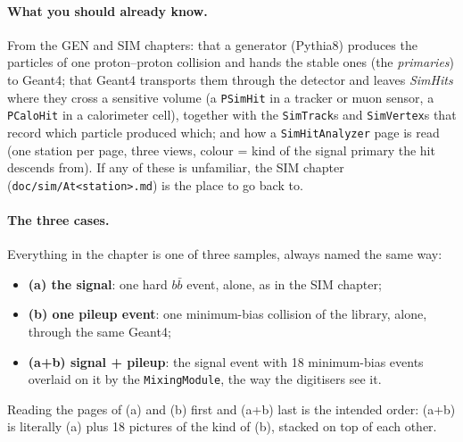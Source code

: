 \documentclass[11pt,a4paper]{article}
\newcommand{\code}[1]{\texttt{#1}}
\newcommand{\bbbar}{\ensuremath{b\bar{b}}}
\begin{document}
\paragraph{What you should already know.} From the GEN and SIM chapters: that a generator (Pythia8) produces
the particles of one proton--proton collision and hands the stable ones (the \emph{primaries}) to Geant4;
that Geant4 transports them through the detector and leaves \emph{SimHits} where they cross a sensitive
volume (a \code{PSimHit} in a tracker or muon sensor, a \code{PCaloHit} in a calorimeter cell), together with
the \code{SimTrack}s and \code{SimVertex}s that record which particle produced which; and how a
\code{SimHitAnalyzer} page is read (one station per page, three views, colour = kind of the signal primary
the hit descends from). If any of these is unfamiliar, the SIM chapter (\code{doc/sim/At<station>.md}) is the
place to go back to.

\paragraph{The three cases.} Everything in the chapter is one of three samples, always named the same way:
\begin{itemize}
\item \textbf{(a) the signal}: one hard \bbbar{} event, alone, as in the SIM chapter;
\item \textbf{(b) one pileup event}: one minimum-bias collision of the library, alone, through the same Geant4;
\item \textbf{(a+b) signal + pileup}: the signal event with 18 minimum-bias events overlaid on it by the
  \code{MixingModule}, the way the digitisers see it.
\end{itemize}
Reading the pages of (a) and (b) first and (a+b) last is the intended order: (a+b) is literally (a) plus 18
pictures of the kind of (b), stacked on top of each other.
\end{document}
